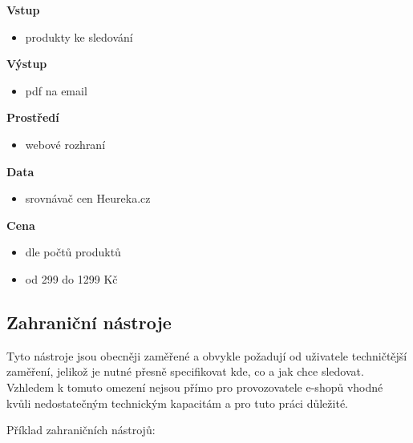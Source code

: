\documentclass[thesis=B,czech]{FITthesis}[2012/06/26]
\begin{document}
\textbf{Vstup}
\begin{itemize}
\item produkty ke sledování
\end{itemize}

\textbf{Výstup}
\begin{itemize}
\item pdf na email
\end{itemize}

\textbf{Prostředí}
\begin{itemize}
\item webové rozhraní
\end{itemize}

\textbf{Data}
\begin{itemize}
\item srovnávač cen Heureka.cz
\end{itemize}

\textbf{Cena}
\begin{itemize}
\item dle počtů produktů
\item od 299 do 1299 Kč
\end{itemize}

\newpage

\subsection{Zahraniční nástroje}
Tyto nástroje jsou obecněji zaměřené a obvykle požadují od uživatele techničtější zaměření, 
jelikož je nutné přesně specifikovat kde, co a jak chce sledovat. Vzhledem k tomuto omezení
nejsou přímo pro provozovatele e-shopů vhodné kvůli nedostatečným technickým kapacitám a 
pro tuto práci důležité.
\par
Příklad zahraničních nástrojů:
\end{document}

